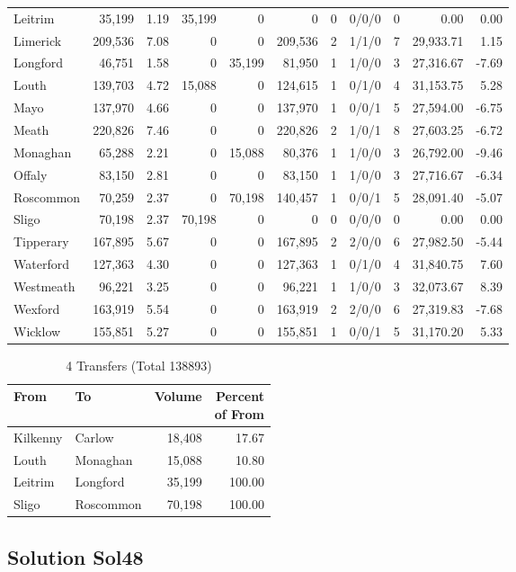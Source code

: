 \documentclass[a4paper]{article}
\begin{document}
\begin{longtable}{lrrrrrrlrrr}
Leitrim&35,199& 1.19&35,199&0&0&0&0/0/0&0& 0.00& 0.00\\ 
Limerick&209,536& 7.08&0&0&209,536&2&1/1/0&7&29,933.71& 1.15\\ 
Longford&46,751& 1.58&0&35,199&81,950&1&1/0/0&3&27,316.67&-7.69\\ 
Louth&139,703& 4.72&15,088&0&124,615&1&0/1/0&4&31,153.75& 5.28\\ 
Mayo&137,970& 4.66&0&0&137,970&1&0/0/1&5&27,594.00&-6.75\\ 
Meath&220,826& 7.46&0&0&220,826&2&1/0/1&8&27,603.25&-6.72\\ 
Monaghan&65,288& 2.21&0&15,088&80,376&1&1/0/0&3&26,792.00&-9.46\\ 
Offaly&83,150& 2.81&0&0&83,150&1&1/0/0&3&27,716.67&-6.34\\ 
Roscommon&70,259& 2.37&0&70,198&140,457&1&0/0/1&5&28,091.40&-5.07\\ 
Sligo&70,198& 2.37&70,198&0&0&0&0/0/0&0& 0.00& 0.00\\ 
Tipperary&167,895& 5.67&0&0&167,895&2&2/0/0&6&27,982.50&-5.44\\ 
Waterford&127,363& 4.30&0&0&127,363&1&0/1/0&4&31,840.75& 7.60\\ 
Westmeath&96,221& 3.25&0&0&96,221&1&1/0/0&3&32,073.67& 8.39\\ 
Wexford&163,919& 5.54&0&0&163,919&2&2/0/0&6&27,319.83&-7.68\\ 
Wicklow&155,851& 5.27&0&0&155,851&1&0/0/1&5&31,170.20& 5.33\\ 
\end{longtable}

\begin{table}[htbp]
\caption{4 Transfers (Total 138893)}
\centering
\begin{tabular}{llrr} \toprule
From &To &Volume &\shortstack{Percent\\of From} \\ \midrule
Kilkenny&Carlow&18,408&17.67\\ 
Louth&Monaghan&15,088&10.80\\ 
Leitrim&Longford&35,199&100.00\\ 
Sligo&Roscommon&70,198&100.00\\ 
\bottomrule
\end{tabular}
\end{table}

\clearpage
\subsection{Solution Sol48}
\end{document}
